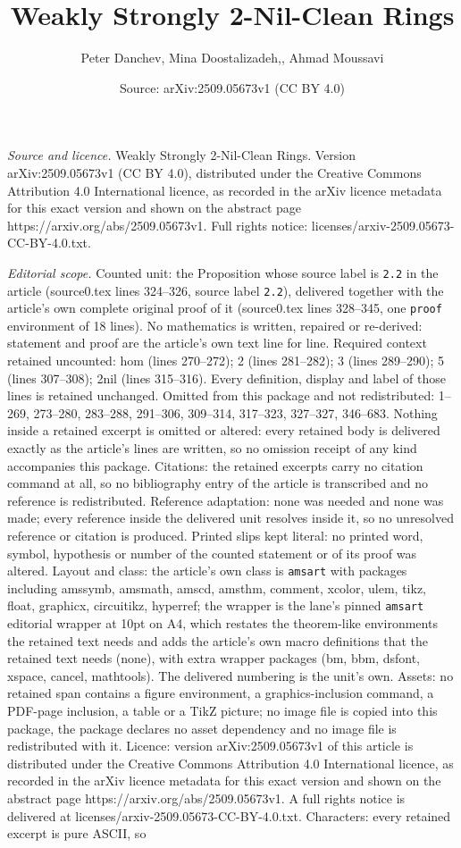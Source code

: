 \documentclass[10pt,a4paper]{amsart}
\title[Weakly Strongly 2-Nil-Clean Rings]{Weakly Strongly 2-Nil-Clean Rings}
\author{Peter Danchev, Mina Doostalizadeh,, Ahmad Moussavi}
\date{Source: arXiv:2509.05673v1 (CC BY 4.0)}
\begin{document}
\maketitle

\noindent\emph{Source and licence.} Weakly Strongly 2-Nil-Clean Rings. Version arXiv:2509.05673v1 (CC BY 4.0), distributed under the Creative Commons Attribution 4.0 International licence, as recorded in the arXiv licence metadata for this exact version and shown on the abstract page https://arxiv.org/abs/2509.05673v1. Full rights notice: licenses/arxiv-2509.05673-CC-BY-4.0.txt.\par\smallskip

\noindent\textit{Editorial scope.} Counted unit: the Proposition whose source label is \texttt{2.2} in the article (source0.tex lines 324--326, source label \texttt{2.2}), delivered together with the article's own complete original proof of it (source0.tex lines 328--345, one \texttt{proof} environment of 18 lines). No mathematics is written, repaired or re-derived: statement and proof are the article's own text line for line. Required context retained uncounted: hom (lines 270--272); 2 (lines 281--282); 3 (lines 289--290); 5 (lines 307--308); 2nil (lines 315--316). Every definition, display and label of those lines is retained unchanged. Omitted from this package and not redistributed: 1--269, 273--280, 283--288, 291--306, 309--314, 317--323, 327--327, 346--683. Nothing inside a retained excerpt is omitted or altered: every retained body is delivered exactly as the article's lines are written, so no omission receipt of any kind accompanies this package. Citations: the retained excerpts carry no citation command at all, so no bibliography entry of the article is transcribed and no reference is redistributed. Reference adaptation: none was needed and none was made; every reference inside the delivered unit resolves inside it, so no unresolved reference or citation is produced. Printed slips kept literal: no printed word, symbol, hypothesis or number of the counted statement or of its proof was altered. Layout and class: the article's own class is \texttt{amsart} with packages including amssymb, amsmath, amscd, amsthm, comment, xcolor, ulem, tikz, float, graphicx, circuitikz, hyperref; the wrapper is the lane's pinned \texttt{amsart} editorial wrapper at 10pt on A4, which restates the theorem-like environments the retained text needs and adds the article's own macro definitions that the retained text needs (none), with extra wrapper packages (bm, bbm, dsfont, xspace, cancel, mathtools). The delivered numbering is the unit's own. Assets: no retained span contains a figure environment, a graphics-inclusion command, a PDF-page inclusion, a table or a TikZ picture; no image file is copied into this package, the package declares no asset dependency and no image file is redistributed with it. Licence: version arXiv:2509.05673v1 of this article is distributed under the Creative Commons Attribution 4.0 International licence, as recorded in the arXiv licence metadata for this exact version and shown on the abstract page https://arxiv.org/abs/2509.05673v1. A full rights notice is delivered at licenses/arxiv-2509.05673-CC-BY-4.0.txt. Characters: every retained excerpt is pure ASCII, so 
\end{document}
